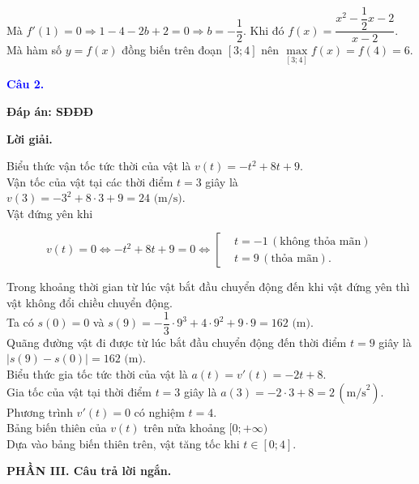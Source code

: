 \documentclass[12pt,a4paper]{article}
\begin{document}
		Mà $f'(1)=0\Rightarrow 1-4-2b+2=0\Rightarrow b=-\dfrac{1}{2}$. Khi đó $f(x)=\dfrac{x^2-\dfrac{1}{2}x-2}{x-2}$. \\

		Mà hàm số $y=f(x)$ đồng biến trên đoạn $[3;4]$ nên $\max\limits_{[3;4]} f(x)=f(4)=6$.

\medskip
\noindent\textcolor{blue}{\textbf{Câu 2.}}

\noindent \textbf{Đáp án: SĐĐĐ}

\noindent\textbf{Lời giải.}

Biểu thức vận tốc tức thời của vật là $v(t)=-t^2+8t+9$.\\

		Vận tốc của vật tại các thời điểm $t=3$ giây là $v(3)=-3^2+8\cdot 3+9=24 \text{ (m/s)}$.\\

		Vật đứng yên khi
		
$$v(t)=0\Leftrightarrow -t^2+8t+9=0\Leftrightarrow \left[\begin{aligned}&t=-1 \,(\text{không thỏa mãn}) \\&t=9 \,(\text{thỏa mãn}).\end{aligned}\right.$$

		Trong khoảng thời gian từ lúc vật bắt đầu chuyển động đến khi vật đứng yên thì vật không đổi chiều chuyển động.\\

		Ta có $s(0)=0$ và $s(9)=-\dfrac{1}{3}\cdot 9^3+4\cdot 9^2+9\cdot 9=162 \text{ (m)}$.\\

		Quãng đường vật đi được từ lúc bắt đầu chuyển động đến thời điểm $t=9$ giây là $\left|s(9)-s(0)\right|=162 \text{ (m)}$.\\

		Biểu thức gia tốc tức thời của vật là $a(t)=v'(t)=-2t+8$.\\

		Gia tốc của vật tại thời điểm $t=3$ giây là $a(3)=-2\cdot 3+8=2\, \left(\text{m/s}^2\right)$.\\

		Phương trình $v'(t)=0$ có nghiệm $t=4$.\\

		Bảng biến thiên của $v(t)$ trên nửa khoảng $[0;+\infty)$\\

Dựa vào bảng biến thiên trên, vật tăng tốc khi $t \in[0; 4]$.

\medskip
\noindent\textbf{PHẦN III. Câu trả lời ngắn.}
\end{document}
